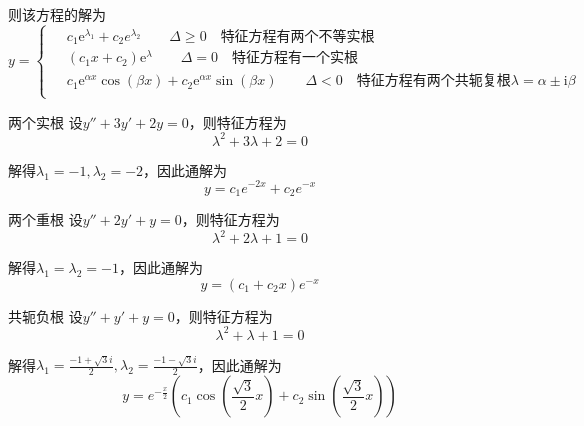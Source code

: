 \documentclass[math]{amznotes}
\begin{document}
则该方程的解为
\begin{equation*}
	y = \left\{
	\begin{aligned}
		\; & c_1 \mathrm{e}^{\lambda_1} + c_2 e^{\lambda_2} \qquad \Delta \ge 0 \quad\text{特征方程有两个不等实根}                                                                       \\
		   & (c_1x + c_2) \mathrm{e}^{\lambda} \qquad \Delta = 0 \quad \text{特征方程有一个实根}                                                                                       \\
		   & c_1 \mathrm{e}^{\alpha x} \cos(\beta x) + c_2 \mathrm{e}^{\alpha x} \sin(\beta x) \qquad \Delta < 0 \quad \text{特征方程有两个共轭复根}\lambda = \alpha \pm \mathrm{i}\beta \\
	\end{aligned}
	\right.
\end{equation*}
\begin{exbox}{两个实根}{}
	设$y'' + 3y' + 2y = 0$，则特征方程为
	\begin{equation*}
		\lambda^2 + 3\lambda + 2 = 0
	\end{equation*}

	解得$\lambda_1 = -1, \lambda_2 = -2$，因此通解为
	\begin{equation*}
		y = c_1 e^{-2x} + c_2 e^{-x}
	\end{equation*}
\end{exbox}
\begin{exbox}{两个重根}{}
	设$y'' + 2y' + y = 0$，则特征方程为
	\begin{equation*}
		\lambda^2 + 2\lambda + 1 = 0
	\end{equation*}

	解得$\lambda_1 = \lambda_2 = -1$，因此通解为
	\begin{equation*}
		y = (c_1 + c_2 x) e^{-x}
	\end{equation*}
\end{exbox}
\begin{exbox}{共轭负根}{}
	设$y'' + y' + y = 0$，则特征方程为
	\begin{equation*}
		\lambda^2 + \lambda + 1 = 0
	\end{equation*}

	解得$\lambda_1 = \frac{-1 + \sqrt{3}i}{2}, \lambda_2 = \frac{-1 - \sqrt{3}i}{2}$，因此通解为
	\begin{equation*}
		y = e^{-\frac{x}{2}}(c_1 \cos(\frac{\sqrt{3}}{2}x) + c_2 \sin(\frac{\sqrt{3}}{2}x))
	\end{equation*}
\end{exbox}
\end{document}
